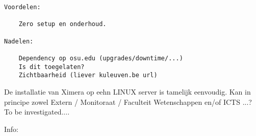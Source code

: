 \documentclass{ximera}
\begin{document}
\begin{verbatim}
Voordelen:

    Zero setup en onderhoud.

Nadelen:

    Dependency op osu.edu (upgrades/downtime/...)
    Is dit toegelaten?
    Zichtbaarheid (liever kuleuven.be url)

\end{verbatim}

De installatie van Ximera op eehn LINUX server is tamelijk eenvoudig. Kan in principe zowel Extern / Monitoraat / Faculteit Wetenschappen en/of ICTS ...? To be investigated....
    
Info: 
\end{document}
